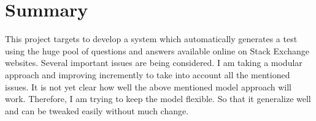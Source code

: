 \documentclass{article}
\begin{document}
\section{Summary}
This project targets to develop a system which automatically generates 
a test using the huge pool of questions and answers available online 
on Stack Exchange websites. Several important issues are being considered. 
I am taking a modular approach and improving incremently to take into account
all the mentioned issues. It is not yet clear how well the above mentioned
model approach will work. Therefore, I am trying to keep the model flexible. So
that it generalize well and can be tweaked easily without much change. 
\end{document}
